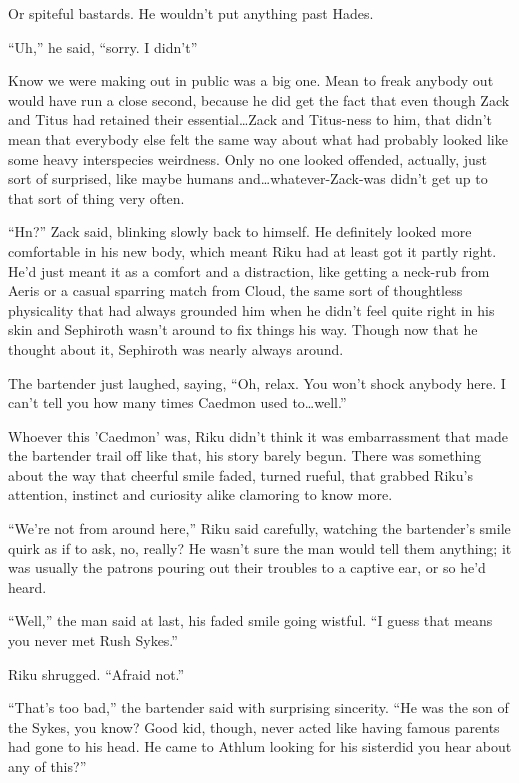 Or spiteful bastards. He wouldn't put anything past Hades.

``Uh,'' he said, ``sorry. I didn't\textemdash ''

Know we were making out in public was a big one. Mean to freak anybody out would have run a close second, because he did get the fact that even though Zack and Titus had retained their essential\ldots Zack and Titus-ness to him, that didn't mean that everybody else felt the same way about what had probably looked like some heavy interspecies weirdness. Only no one looked offended, actually, just sort of surprised, like maybe humans and\ldots whatever-Zack-was didn't get up to that sort of thing very often.

``Hn?'' Zack said, blinking slowly back to himself. He definitely looked more comfortable in his new body, which meant Riku had at least got it partly right. He'd just meant it as a comfort and a distraction, like getting a neck-rub from Aeris or a casual sparring match from Cloud, the same sort of thoughtless physicality that had always grounded him when he didn't feel quite right in his skin and Sephiroth wasn't around to fix things his way. Though now that he thought about it, Sephiroth was nearly always around.

The bartender just laughed, saying, ``Oh, relax. You won't shock anybody here. I can't tell you how many times Caedmon used to\ldots well.''

Whoever this 'Caedmon' was, Riku didn't think it was embarrassment that made the bartender trail off like that, his story barely begun. There was something about the way that cheerful smile faded, turned rueful, that grabbed Riku's attention, instinct and curiosity alike clamoring to know more.

``We're not from around here,'' Riku said carefully, watching the bartender's smile quirk as if to ask, no, really? He wasn't sure the man would tell them anything; it was usually the patrons pouring out their troubles to a captive ear, or so he'd heard.

``Well,'' the man said at last, his faded smile going wistful. ``I guess that means you never met Rush Sykes.''

Riku shrugged. ``Afraid not.''

``That's too bad,'' the bartender said with surprising sincerity. ``He was the son of the Sykes, you know? Good kid, though, never acted like having famous parents had gone to his head. He came to Athlum looking for his sister\textemdash did you hear about any of this?''

